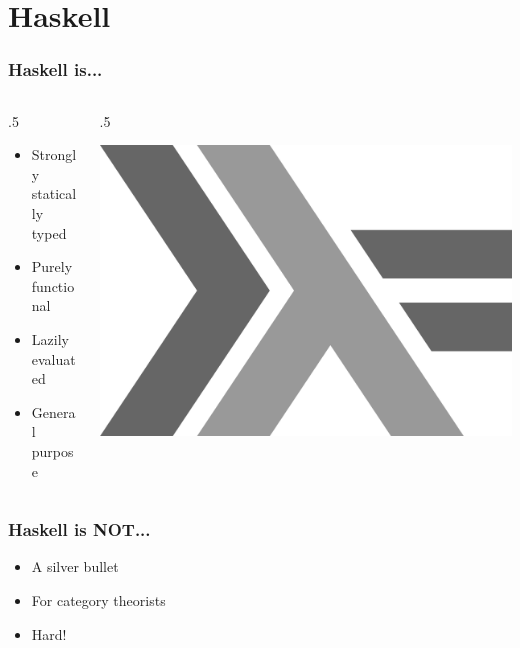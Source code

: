 \documentclass[17pt]{beamer}
\renewcommand{\(}[1]{\begin{columns}[#1]}
\renewcommand{\)}{\end{columns}}
\newcommand{\<}[1]{\begin{column}{#1}}
\renewcommand{\>}{\end{column}}
\begin{document}
\section{Haskell}

\begin{frame}
  \frametitle{Haskell is...}
  \({c}
  \<{.5\textwidth}
  \begin{center}
    \begin{itemize}
    \item Strongly statically typed
    \item Purely functional
    \item Lazily evaluated
    \item General purpose
    \end{itemize}
  \end{center}
  \>
  \<{.5\textwidth}
  \begin{center}
    \includegraphics[width=.5\textwidth]{img/haskell-logo}
  \end{center}
  \>
  \)
\end{frame}

\begin{frame}
  \frametitle{Haskell is NOT...}
  \begin{center}
    \begin{itemize}
    \item A silver bullet
    \item For category theorists
    \item<2-> Hard! 
    \end{itemize}
  \end{center}
\end{frame}
\end{document}
